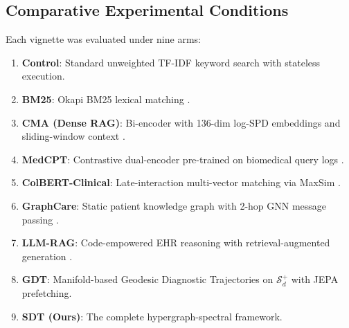 \documentclass[ijds,dblanonrev]{informs4}
\begin{document}
\subsection{Comparative Experimental Conditions}
Each vignette was evaluated under nine arms:
\begin{enumerate}[(1)]
  \item \textbf{Control}: Standard unweighted TF-IDF keyword search with stateless execution.
  \item \textbf{BM25}: Okapi BM25 lexical matching \citep{baeza1999modern}.
  \item \textbf{CMA (Dense RAG)}: Bi-encoder with 136-dim log-SPD embeddings and sliding-window context \citep{lewis2020retrieval}.
  \item \textbf{MedCPT}: Contrastive dual-encoder pre-trained on biomedical query logs \citep{jin2023medcpt}.
  \item \textbf{ColBERT-Clinical}: Late-interaction multi-vector matching via MaxSim \citep{santhanam2022colbertv2}.
  \item \textbf{GraphCare}: Static patient knowledge graph with 2-hop GNN message passing \citep{jiang2024graphcare}.
  \item \textbf{LLM-RAG}: Code-empowered EHR reasoning with retrieval-augmented generation \citep{eickhoff2024ehrrag}.
  \item \textbf{GDT}: Manifold-based Geodesic Diagnostic Trajectories on $\mathcal{S}_d^+$ with JEPA prefetching.
  \item \textbf{SDT (Ours)}: The complete hypergraph-spectral framework.
\end{enumerate}
\end{document}
